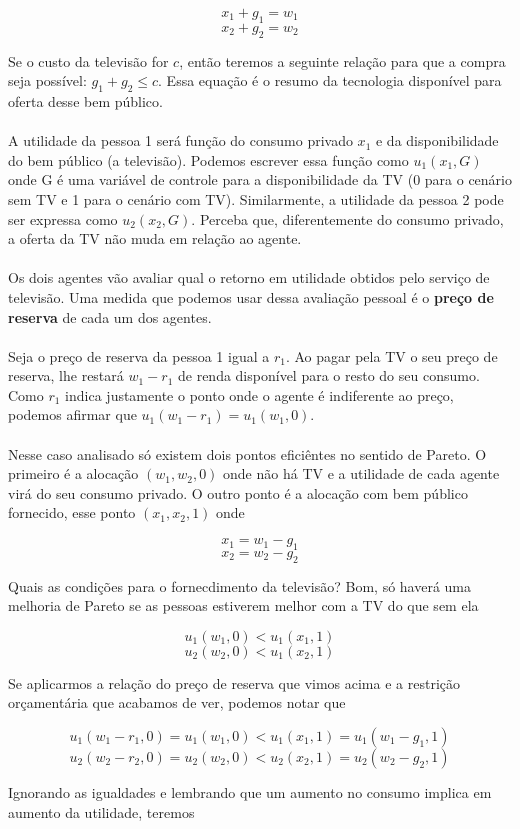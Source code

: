 \documentclass[a4paper,11pt,oneside]{book}
\theoremstyle{definition}
\theoremstyle{break}
\begin{document}
$$ x_1 + g_1 = w_1 $$
$$ x_2 + g_2 = w_2 $$

Se o custo da televisão for $c$, então teremos a seguinte relação para que a compra seja possível: $g_1 + g_2 \leq c$. Essa equação é o resumo da tecnologia disponível para oferta desse bem público.
\\~\\
A utilidade da pessoa 1 será função do consumo privado $x_1$ e da disponibilidade do bem público (a televisão). Podemos escrever essa função como $u_1(x_1,G)$ onde G é uma variável de controle para a disponibilidade da TV (0 para o cenário sem TV e 1 para o cenário com TV). Similarmente, a utilidade da pessoa 2 pode ser expressa como $u_2(x_2,G)$. Perceba que, diferentemente do consumo privado, a oferta da TV não muda em relação ao agente.
\\~\\
Os dois agentes vão avaliar qual o retorno em utilidade obtidos pelo serviço de televisão. Uma medida que podemos usar dessa avaliação pessoal é o \textbf{preço de reserva} de cada um dos agentes.
\\~\\
Seja o preço de reserva da pessoa 1 igual a $r_1$. Ao pagar pela TV o seu preço de reserva, lhe restará $w_1 - r_1$ de renda disponível para o resto do seu consumo. Como $r_1$ indica justamente o ponto onde o agente é indiferente ao preço, podemos afirmar que $u_1(w_1 - r_1) = u_1(w_1,0)$.
\\~\\
Nesse caso analisado só existem dois pontos eficiêntes no sentido de Pareto. O primeiro é a alocação $(w_1,w_2,0)$ onde não há TV e a utilidade de cada agente virá do seu consumo privado. O outro ponto é a alocação com bem público fornecido, esse ponto $(x_1,x_2,1)$ onde 

$$ x_1 = w_1 - g_1$$
$$ x_2 = w_2 - g_2$$

Quais as condições para o fornecdimento da televisão? Bom, só haverá uma melhoria de Pareto se as pessoas estiverem melhor com a TV do que sem ela

$$u_1(w_1,0) < u_1(x_1,1)$$
$$u_2(w_2,0) < u_1(x_2,1)$$

Se aplicarmos a relação do preço de reserva que vimos acima e a restrição orçamentária que acabamos de ver, podemos notar que

$$u_1(w_1 - r_1,0) = u_1(w_1,0) < u_1(x_1,1) = u_1(w_1 - g_1,1)$$
$$u_2(w_2 - r_2,0) = u_2(w_2,0) < u_2(x_2,1) = u_2(w_2 - g_2,1)$$

Ignorando as igualdades e lembrando que um aumento no consumo implica em aumento da utilidade, teremos
\end{document}
